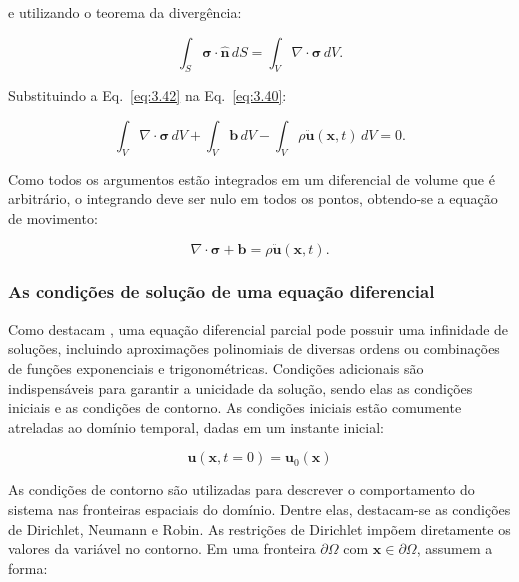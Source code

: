 e utilizando o teorema da divergência: 
 
\begin{equation}
    \int_S \boldsymbol{\sigma} \cdot \hat{\mathbf{n}} \, dS = \int_V \nabla \cdot \boldsymbol{\sigma} \, dV. 
    \label{eq:3.42}
\end{equation}


\indent Substituindo a Eq.~\ref{eq:3.42} na Eq.~\ref{eq:3.40}: 

\begin{equation}
    \int_V \nabla \cdot \boldsymbol{\sigma} \, dV  + \int_V \mathbf{b} \, dV - \int_V \rho \ddot{\mathbf{u}}(\mathbf{x},t) \, dV = 0.
    \label{eq:3.43}
\end{equation}

\indent Como todos os argumentos estão integrados em um diferencial de volume que é arbitrário, o integrando deve ser nulo em todos os pontos, obtendo-se a equação de movimento: 

\begin{equation}
    \nabla \cdot \boldsymbol{\sigma}  +  \mathbf{b}  = \rho \ddot{\mathbf{u}}(\mathbf{x},t).
    \label{eq:3.44}
\end{equation}


\subsubsection{As condições de solução de uma equação diferencial}

\indent Como destacam \citet{hillen2019partial}, uma equação diferencial parcial pode possuir uma infinidade de soluções, incluindo aproximações polinomiais de diversas ordens ou combinações de funções exponenciais e trigonométricas. Condições adicionais são indispensáveis para garantir a unicidade da solução, sendo elas as condições iniciais e as condições de contorno. As condições iniciais estão comumente atreladas ao domínio temporal, dadas em um instante inicial: 

\begin{equation}
    \mathbf{u}(\mathbf{x},t=0) = \mathbf{u}_0(\mathbf{x})
    \label{eq:3.45}
\end{equation}

	
\indent As condições de contorno são utilizadas para descrever o comportamento do sistema nas fronteiras espaciais do domínio. Dentre elas, destacam-se as condições de Dirichlet, Neumann e Robin. As restrições de Dirichlet impõem diretamente os valores da variável no contorno. Em uma fronteira $\partial \Omega$ com $\mathbf{x} \in \partial \Omega$, assumem a forma: 

